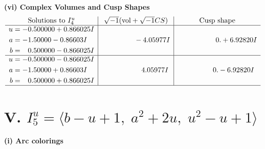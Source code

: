 \documentclass[1p]{elsarticle_modified}
\theoremstyle{definition}
\newcommand{\I}{\sqrt{-1}}
\begin{document}
\newpage\flushleft \textbf{(vi) Complex Volumes and Cusp Shapes}
$$\begin{array}{c|c|c}  
\text{Solutions to }I^u_{4}& \I (\text{vol} + \sqrt{-1}CS) & \text{Cusp shape}\\
 \hline 
\begin{aligned}
u &= -0.500000 + 0.866025 I \\
a &= -1.50000 - 0.86603 I \\
b &= \phantom{-}0.500000 - 0.866025 I\end{aligned}
 & \phantom{-0.000000 } -4.05977 I & \phantom{-0.000000 -}0. + 6.92820 I \\ \hline\begin{aligned}
u &= -0.500000 - 0.866025 I \\
a &= -1.50000 + 0.86603 I \\
b &= \phantom{-}0.500000 + 0.866025 I\end{aligned}
 & \phantom{-0.000000 -}4.05977 I & \phantom{-0.000000 } 0. - 6.92820 I\\
 \hline 
 \end{array}$$\newpage\newpage\renewcommand{\arraystretch}{1}
\centering \section*{V. $I^u_{5}= \langle b- u+1,\;a^2+2 u,\;u^2- u+1 \rangle$}
\flushleft \textbf{(i) Arc colorings}\\
\end{document}

